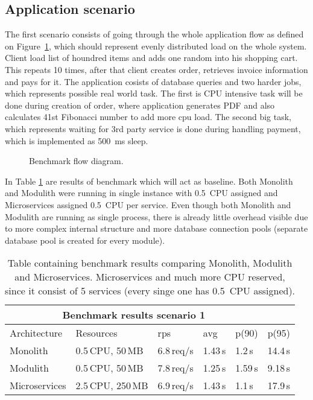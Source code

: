 \subsection{Application scenario}
The first scenario consists of going through the whole application flow as defined on Figure~\ref{img:benchmark_flow}, which should represent evenly distributed load on the whole system. Client load list of houndred items and adds one random into his shopping cart. This repeats 10 times, after that client creates order, retrieves invoice information and pays for it. The application cosists of database queries and two harder jobs, which represents possible real world task. The first is CPU intensive task will be done during creation of order, where application generates PDF and also calculates 41st Fibonacci number to add more cpu load. The second big task, which represents waiting for 3rd party service is done during handling payment, which is implemented as 500~ms sleep.

\begin{figure}
    \centering
    
    \caption{Benchmark flow diagram. \label{img:benchmark_flow}}
\end{figure}

In Table \ref{table:benchmark_baseline} are results of benchmark which will act as baseline. Both Monolith and Modulith were running in single instance with 0.5~CPU assigned and Microservices assigned 0.5~CPU per service. Even though both Monolith and Modulith are running as single process, there is already little overhead visible due to more complex internal structure and more database connection pools (separate database pool is created for every module).

\begin{table}
    \begin{tabular}{ |p{3cm}||p{3cm}|p{1.5cm}|p{1.5cm}|p{1.5cm}|p{1.5cm}| }
        \hline
        \multicolumn{5}{|c|}{Benchmark results scenario 1}                           \\
        \hline
        Architecture  & Resources         & rps        & avg     & p(90)   & p(95)   \\
        \hline
        Monolith      & 0.5\,CPU, 50\,MB  & 6.8\,req/s & 1.43\,s & 1.2\,s  & 14.4\,s \\
        Modulith      & 0.5\,CPU, 50\,MB  & 7.8\,req/s & 1.25\,s & 1.59\,s & 9.18\,s \\
        Microservices & 2.5\,CPU, 250\,MB & 6.9\,req/s & 1.43\,s & 1.1\,s  & 17.9\,s \\
        \hline
    \end{tabular}
    \caption{Table containing benchmark results comparing Monolith, Modulith and Microservices. Microservices and much more CPU reserved, since it consist of 5 services (every singe one has 0.5~CPU assigned).\label{table:benchmark_baseline}}
\end{table}

